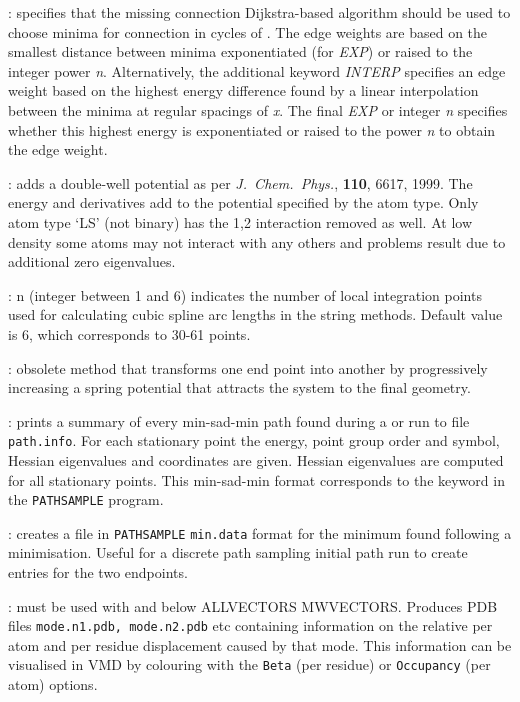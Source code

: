 {{: specifies that the missing connection
Dijkstra-based algorithm\cite{CarrTW05} should be used to choose minima for connection in cycles
of .
The edge weights are based on the smallest distance between minima exponentiated (for {\it EXP}) or
raised to the integer power {\it n}.
Alternatively, the additional keyword {\it INTERP\/} specifies an edge weight based on
the highest energy difference found by a linear interpolation between the minima at regular spacings
of {\it x}. 
The final {\it EXP\/} or integer {\it n} specifies whether this highest energy is exponentiated
or raised to the power {\it n} to obtain the edge weight.

: adds a double-well potential as per {\it J.~Chem.~Phys.\/},
        {\bf 110}, 6617, 1999. The
        energy and derivatives add to the potential specified by the atom
        type. Only atom type
        `LS' (not binary) has the 1,2 interaction removed as well.
        At low density some atoms may not interact with any others and
        problems result due to additional zero eigenvalues.

: n (integer between 1 and 6) indicates the number of local 
integration points used for calculating cubic spline arc lengths in the string methods. 
Default value is 6, which corresponds to 30-61 points. 

: obsolete method that transforms one end point into another
by progressively increasing a spring potential that attracts the system to the
final geometry.

: prints a summary of every min-sad-min path 
found during a {} or  run to
file {\tt path.info}. For each stationary point the energy, point group order and symbol, 
Hessian eigenvalues and coordinates are given. Hessian eigenvalues are computed
for all stationary points. This min-sad-min format corresponds to the {\/}
keyword in the {\tt PATHSAMPLE} program.

: creates a file in {\tt PATHSAMPLE} {\tt min.data} format for the minimum found
following a minimisation. Useful for a discrete path sampling initial path run to
create entries for the two endpoints.

: must be used with and below { ALLVECTORS MWVECTORS}. Produces PDB files {\tt mode.n1.pdb, mode.n2.pdb} etc containing information on the relative per atom and per residue displacement caused by that mode. This information can be visualised in VMD by colouring with the {\tt Beta} (per residue) or {\tt Occupancy} (per atom) options.

}}
